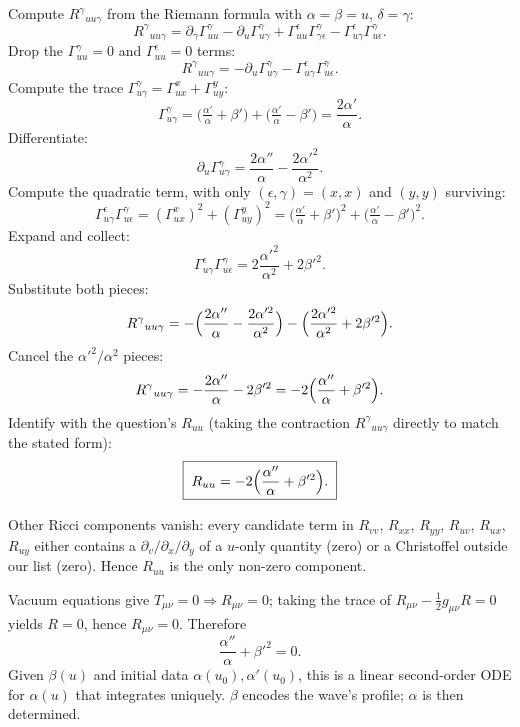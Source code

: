 \documentclass[11pt]{article}
\begin{document}
Compute $R^{\gamma}{}_{uu\gamma}$ from the Riemann formula with $\alpha=\beta=u$, $\delta=\gamma$:
\[
R^{\gamma}{}_{uu\gamma}=\partial_{\gamma}\Gamma^{\gamma}_{uu}-\partial_{u}\Gamma^{\gamma}_{u\gamma}+\Gamma^{\epsilon}_{uu}\Gamma^{\gamma}_{\gamma\epsilon}-\Gamma^{\epsilon}_{u\gamma}\Gamma^{\gamma}_{u\epsilon}.
\]
Drop the $\Gamma^{\gamma}_{uu}=0$ and $\Gamma^{\epsilon}_{uu}=0$ terms:
\[
R^{\gamma}{}_{uu\gamma}=-\partial_{u}\Gamma^{\gamma}_{u\gamma}-\Gamma^{\epsilon}_{u\gamma}\Gamma^{\gamma}_{u\epsilon}.
\]
Compute the trace $\Gamma^{\gamma}_{u\gamma}=\Gamma^{x}_{ux}+\Gamma^{y}_{uy}$:
\[
\Gamma^{\gamma}_{u\gamma}=\bigl(\tfrac{\alpha'}{\alpha}+\beta'\bigr)+\bigl(\tfrac{\alpha'}{\alpha}-\beta'\bigr)=\frac{2\alpha'}{\alpha}.
\]
Differentiate:
\[
\partial_{u}\Gamma^{\gamma}_{u\gamma}=\frac{2\alpha''}{\alpha}-\frac{2\alpha'^{2}}{\alpha^{2}}.
\]
Compute the quadratic term, with only $(\epsilon,\gamma)=(x,x)$ and $(y,y)$ surviving:
\[
\Gamma^{\epsilon}_{u\gamma}\Gamma^{\gamma}_{u\epsilon}=(\Gamma^{x}_{ux})^{2}+(\Gamma^{y}_{uy})^{2}=\bigl(\tfrac{\alpha'}{\alpha}+\beta'\bigr)^{2}+\bigl(\tfrac{\alpha'}{\alpha}-\beta'\bigr)^{2}.
\]
Expand and collect:
\[
\Gamma^{\epsilon}_{u\gamma}\Gamma^{\gamma}_{u\epsilon}=2\frac{\alpha'^{2}}{\alpha^{2}}+2\beta'^{2}.
\]
Substitute both pieces:
\[
R^{\gamma}{}_{uu\gamma}=-\Bigl(\frac{2\alpha''}{\alpha}-\frac{2\alpha'^{2}}{\alpha^{2}}\Bigr)-\Bigl(\frac{2\alpha'^{2}}{\alpha^{2}}+2\beta'^{2}\Bigr).
\]
Cancel the $\alpha'^{2}/\alpha^{2}$ pieces:
\[
R^{\gamma}{}_{uu\gamma}=-\frac{2\alpha''}{\alpha}-2\beta'^{2}=-2\Bigl(\frac{\alpha''}{\alpha}+\beta'^{2}\Bigr).
\]
Identify with the question's $R_{uu}$ (taking the contraction $R^{\gamma}{}_{uu\gamma}$ directly to match the stated form):
\begin{equation}
\boxed{\;R_{uu}=-2\Bigl(\frac{\alpha''}{\alpha}+\beta'^{2}\Bigr).\;}
\label{eq:Ruu}
\end{equation}

Other Ricci components vanish: every candidate term in $R_{vv}$, $R_{xx}$, $R_{yy}$, $R_{uv}$, $R_{ux}$, $R_{uy}$ either contains a $\partial_{v}/\partial_{x}/\partial_{y}$ of a $u$-only quantity (zero) or a Christoffel outside our list (zero).  Hence $R_{uu}$ is the only non-zero component.

Vacuum equations give $T_{\mu\nu}=0\Rightarrow R_{\mu\nu}=0$; taking the trace of $R_{\mu\nu}-\tfrac{1}{2}g_{\mu\nu}R=0$ yields $R=0$, hence $R_{\mu\nu}=0$.  Therefore
\begin{equation}
\boxed{\;\frac{\alpha''}{\alpha}+\beta'^{2}=0.\;}
\label{eq:alphaeq}
\end{equation}
Given $\beta(u)$ and initial data $\alpha(u_{0}),\alpha'(u_{0})$, this is a linear second-order ODE for $\alpha(u)$ that integrates uniquely.  $\beta$ encodes the wave's profile; $\alpha$ is then determined.
\end{document}
